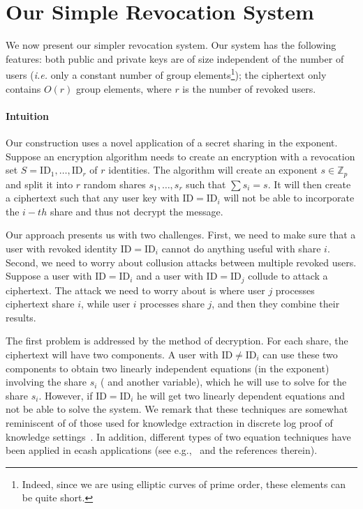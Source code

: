 \documentclass[a4paper, 11pt]{article}
\newcommand{\Z}{\ensuremath{\mathbb{Z}}}
\theoremstyle{definition}
\newcommand{\Zp}{\ensuremath{{\Z_p}}}
\newcommand{\ID}{\ensuremath{\textrm{ID}}}
\begin{document}
\section{Our Simple Revocation System}
\label{sec:construction}
We now present our simpler revocation system. Our system has the following
features: both public and private keys are of size independent of the
number of users (\emph{i.e.} only a constant number of group
elements\footnote{Indeed, since we are using elliptic curves of prime
  order, these elements can be quite short.}); the ciphertext only
contains $O(r)$ group elements, where $r$ is the number of revoked
users.

\paragraph{Intuition} Our construction uses a novel application of a
secret sharing in the exponent.  Suppose an encryption algorithm needs
to create an encryption with a revocation set $S=\ID_1,\ldots,\ID_r$
of $r$ identities. The algorithm will create an exponent $s \in \Zp$
and split it into $r$ random shares $s_1, \ldots, s_r$ such that $\sum
s_i=s$. It will then create a ciphertext such that any user key with
$\ID=\ID_i$ will not be able to incorporate the $i-th$ share and thus
not decrypt the message.

Our approach presents us with two challenges. First, we need to make
sure that a user with revoked identity $\ID=\ID_i$ cannot do anything
useful with share $i$. Second, we need to worry about collusion
attacks between multiple revoked users. Suppose a user with
$\ID=\ID_i$ and a user with $\ID=\ID_j$ collude to attack a
ciphertext.  The attack we need to worry about is where user $j$
processes ciphertext share $i$, while user $i$ processes share $j$,
and then they combine their results.

The first problem is addressed by the method of decryption. For each
share, the ciphertext will have two components. A user with $\ID \neq
\ID_i$ can use these two components to obtain two linearly independent
equations (in the exponent) involving the share $s_i$ ( and another
variable), which he will use to solve for the share $s_i$.  However,
if $\ID=\ID_i$ he will get two linearly dependent equations and not be
able to solve the system. We remark that these techniques are somewhat
reminiscent of of those used for knowledge extraction in discrete log
proof of knowledge settings~\cite{S91}. In addition, different types
of two equation techniques have been applied in ecash applications
(see e.g.,~\cite{CHL05} and the references therein).
\end{document}
